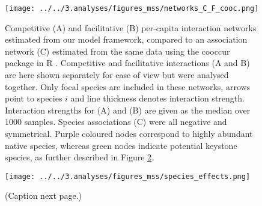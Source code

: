 \documentclass[a4,12pt]{article}
\begin{document}
    \begin{figure}[H]
        \begin{centering}
        \texttt{[image: ../../3.analyses/figures\_mss/networks\_C\_F\_cooc.png]}
        \caption{Competitive (A) and facilitative (B) per-capita interaction networks estimated from our model framework, compared to an association network (C) estimated from the same data using the cooccur package in R \parencite{Griffith2016}. Competitive and facilitative interactions (A and B) are here shown separately for ease of view but were analysed together. Only focal species are included in these networks, arrows point to species $i$ and line thickness denotes interaction strength. Interaction strengths for (A) and (B) are given as the median over 1000 samples. Species associations (C) were all negative and symmetrical. Purple coloured nodes correspond to highly abundant native species, whereas green nodes indicate potential keystone species, as further described in Figure \ref{fig:species}.}
        \label{fig:netwks}
       \end{centering}
    \end{figure}  


    \begin{figure}[H]
        \begin{centering}
        \texttt{[image: ../../3.analyses/figures\_mss/species\_effects.png]}
        \caption{(Caption next page.)}
        \label{fig:species}
        \end{centering}
    \end{figure} 
\end{document}
